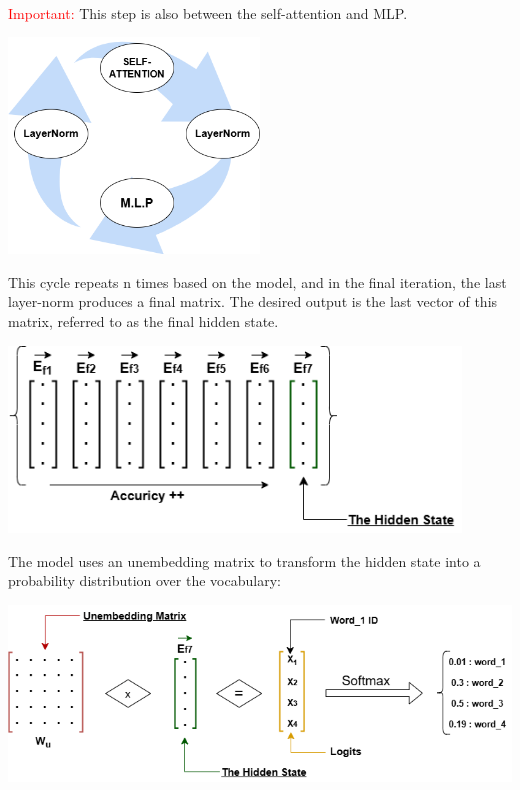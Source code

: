 \documentclass[12pt]{article}
\begin{document}
\textcolor{red}{\\Important:} This step is also between the self-attention and MLP.

\begin{center}
    \includegraphics[width=0.5\textwidth]{images/llm9.png}
\end{center}

This cycle repeats n times based on the model, and in the final iteration, the last layer-norm produces a final matrix. The desired output is the last vector of this matrix, referred to as the final hidden state.\\
\begin{center}
    \includegraphics[width=0.9\textwidth]{images/llm10.png}
\end{center}
The model uses an unembedding matrix to transform the hidden state into a probability distribution over the vocabulary:
\begin{center}
    \includegraphics[width=1.1\textwidth]{images/llm13.png}
\end{center}
\end{document}
